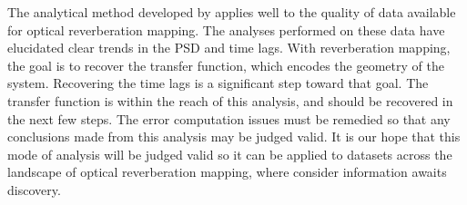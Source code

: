 \documentclass[11pt,letterpaper]{article}
\begin{document}
The analytical method developed by \cite{2013ApJ...777...24Z} applies well to the quality of data available for optical reverberation mapping. The analyses performed on these data have elucidated clear trends in the PSD and time lags. With reverberation mapping, the goal is to recover the transfer function, which encodes the geometry of the system. Recovering the time lags is a significant step toward that goal. The transfer function is within the reach of this analysis, and should be recovered in the next few steps. The error computation issues must be remedied so that any conclusions made from this analysis may be judged valid. It is our hope that this mode of analysis will be judged valid so it can be applied to datasets across the landscape of optical reverberation mapping, where consider information awaits discovery.



\end{document}
